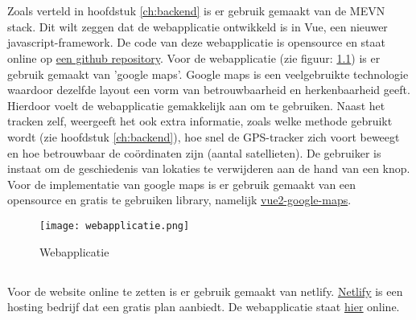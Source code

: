 \chapter{}
\label{ch:frontend}

\section{}
Zoals verteld in hoofdstuk \ref{ch:backend} is er gebruik gemaakt van de MEVN stack. Dit wilt zeggen dat de webapplicatie ontwikkeld is in Vue, een nieuwer javascript-framework. De code van deze webapplicatie is opensource en staat online op \href{https://github.com/IndyVC/bap-frontend}{een github repository}.
\newline
Voor de webapplicatie (zie figuur: \ref{fig:webapplicatie}) is er gebruik gemaakt van 'google maps'. Google maps is een veelgebruikte technologie waardoor dezelfde layout een vorm van betrouwbaarheid en herkenbaarheid geeft. Hierdoor voelt de webapplicatie gemakkelijk aan om te gebruiken. Naast het tracken zelf, weergeeft het ook extra informatie, zoals welke methode gebruikt wordt (zie hoofdstuk \ref{ch:backend}), hoe snel de GPS-tracker zich voort beweegt en hoe betrouwbaar de coördinaten zijn (aantal satellieten). De gebruiker is instaat om de geschiedenis van lokaties te verwijderen aan de hand van een knop.
\newline
Voor de implementatie van google maps is er gebruik gemaakt van een opensource en gratis te gebruiken library, namelijk \href{https://www.npmjs.com/package/vue2-google-maps}{vue2-google-maps}.
\begin{figure}
	\texttt{[image: webapplicatie.png]}
	\caption{Webapplicatie}
	\label{fig:webapplicatie}
\end{figure}

\section{}
Voor de website online te zetten is er gebruik gemaakt van netlify. \href{https://www.netlify.com/}{Netlify} is een hosting bedrijf dat een gratis plan aanbiedt. De webapplicatie staat \href{https://indy-bap-frontend.netlify.com/}{\underline{hier}} online.